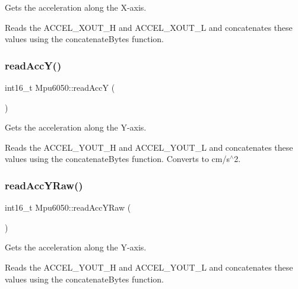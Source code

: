 Gets the acceleration along the X-\/axis. 

Reads the A\+C\+C\+E\+L\+\_\+\+X\+O\+U\+T\+\_\+H and A\+C\+C\+E\+L\+\_\+\+X\+O\+U\+T\+\_\+L and concatenates these values using the concatenate\+Bytes function. \mbox{\label{classMpu6050_aee59cc7d2af6f37d0b559d15070069eb}} 
\subsubsection{\texorpdfstring{read\+Acc\+Y()}{readAccY()}}
{\footnotesize\ttfamily int16\+\_\+t Mpu6050\+::read\+AccY (\begin{DoxyParamCaption}{ }\end{DoxyParamCaption})\hspace{0.3cm}{\ttfamily [virtual]}}



Gets the acceleration along the Y-\/axis. 

Reads the A\+C\+C\+E\+L\+\_\+\+Y\+O\+U\+T\+\_\+H and A\+C\+C\+E\+L\+\_\+\+Y\+O\+U\+T\+\_\+L and concatenates these values using the concatenate\+Bytes function. Converts to cm/s$^\wedge$2. \mbox{\label{classMpu6050_a3196a0eba88490f3699ddb50dc902604}} 
\subsubsection{\texorpdfstring{read\+Acc\+Y\+Raw()}{readAccYRaw()}}
{\footnotesize\ttfamily int16\+\_\+t Mpu6050\+::read\+Acc\+Y\+Raw (\begin{DoxyParamCaption}{ }\end{DoxyParamCaption})\hspace{0.3cm}{\ttfamily [virtual]}}



Gets the acceleration along the Y-\/axis. 

Reads the A\+C\+C\+E\+L\+\_\+\+Y\+O\+U\+T\+\_\+H and A\+C\+C\+E\+L\+\_\+\+Y\+O\+U\+T\+\_\+L and concatenates these values using the concatenate\+Bytes function. \mbox{\label{classMpu6050_a5b29cdb8209e51e810cc859acdd90fa7}} 
